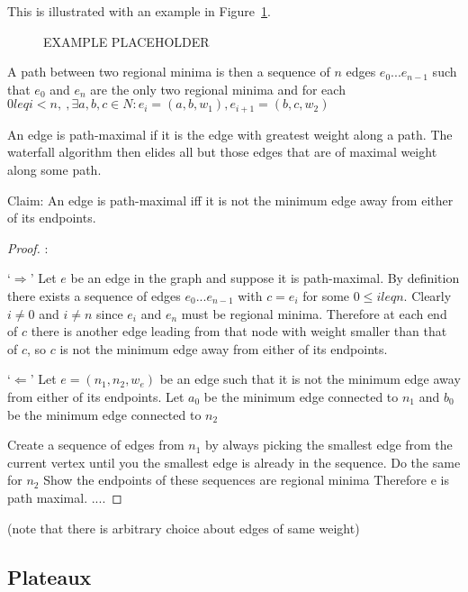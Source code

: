 \documentclass{jfp}
\begin{document}
This is illustrated with an example in Figure~\ref{fig:surround}.

\begin{figure}
\centering
\ifpdf
\else
\fi
\caption{EXAMPLE PLACEHOLDER}
\label{fig:surround}
\end{figure}


A path between two regional minima is then a sequence of $n$ edges $e_0 ... e_{n-1}$
such that $e_0$ and $e_n$ are the only two regional minima
and for each $ 0 leq i < n,\ , \exists a,b,c \in N \colon e_i = (a,b,w_1) , e_{i+1} = (b,c,w_2)$

\noindent An edge is path-maximal if it is the edge with greatest weight along a path.
The waterfall algorithm then elides all but those edges that are of maximal weight along some path.

\noindent Claim: An edge is path-maximal iff it is not the minimum edge away from either of its endpoints.

\begin{proof}:

\noindent `$\Rightarrow$'
\indent
  Let $e$ be an edge in the graph and suppose it is path-maximal.
  By definition there exists a sequence of edges $e_0 ... e_{n-1}$
  with $c = e_i$ for some $ 0 \leq i leq n$. Clearly $i \neq 0$ and $i \neq n$ since
  $e_i$ and $e_n$ must be regional minima. Therefore at each end of $c$ there is another edge
  leading from that node with weight smaller than that of $c$, so $c$ is
  not the minimum edge away from either of its endpoints.


\noindent
`$\Leftarrow$'
\indent
  Let $e = (n_1,n_2,w_e)$ be an edge such that it is not the minimum edge away from either of its endpoints.
  Let  $a_0$ be the minimum edge connected to $n_1$ and $b_0$ be the minimum edge connected to $n_2$

  Create a sequence of edges from $n_1$ by always picking the smallest edge from the current vertex until
  you the smallest edge is already in the sequence.
  Do  the same for $n_2$
  Show the endpoints of these sequences are regional minima
  Therefore e is path maximal.
  ....


\end{proof}


(note that there is arbitrary choice about edges of same weight)


\subsection{Plateaux}
\end{document}
